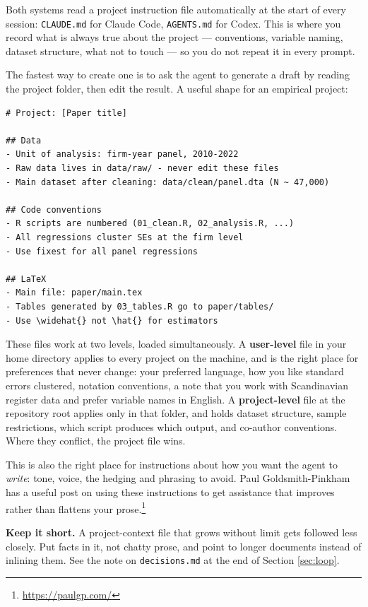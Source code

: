 \documentclass[11pt,a4paper]{article}
\newcommand{\code}[1]{\texttt{\small #1}}
\begin{document}
Both systems read a project instruction file automatically at the start of every
session: \code{CLAUDE.md} for Claude Code, \code{AGENTS.md} for Codex. This is
where you record what is always true about the project --- conventions, variable
naming, dataset structure, what not to touch --- so you do not repeat it in every
prompt.

The fastest way to create one is to ask the agent to generate a draft by reading
the project folder, then edit the result. A useful shape for an empirical
project:

\begin{promptbox}
\begin{Verbatim}[breaklines,fontsize=\small]
# Project: [Paper title]

## Data
- Unit of analysis: firm-year panel, 2010-2022
- Raw data lives in data/raw/ - never edit these files
- Main dataset after cleaning: data/clean/panel.dta (N ~ 47,000)

## Code conventions
- R scripts are numbered (01_clean.R, 02_analysis.R, ...)
- All regressions cluster SEs at the firm level
- Use fixest for all panel regressions

## LaTeX
- Main file: paper/main.tex
- Tables generated by 03_tables.R go to paper/tables/
- Use \widehat{} not \hat{} for estimators
\end{Verbatim}
\end{promptbox}

These files work at two levels, loaded simultaneously. A \textbf{user-level} file
in your home directory applies to every project on the machine, and is the right
place for preferences that never change: your preferred language, how you like
standard errors clustered, notation conventions, a note that you work with
Scandinavian register data and prefer variable names in English. A
\textbf{project-level} file at the repository root applies only in that folder, and
holds dataset structure, sample restrictions, which script produces which
output, and co-author conventions. Where they conflict, the project file wins.

This is also the right place for instructions about how you want the agent to
\emph{write}: tone, voice, the hedging and phrasing to avoid. Paul
Goldsmith-Pinkham has a useful post on using these instructions to get assistance
that improves rather than flattens your prose.\footnote{\url{https://paulgp.com/}}

\begin{aside}
\textbf{Keep it short.} A project-context file that grows without limit gets
followed less closely. Put facts in it, not chatty prose, and point to longer
documents instead of inlining them. See the note on \code{decisions.md} at the
end of Section \ref{sec:loop}.
\end{aside}
\end{document}
